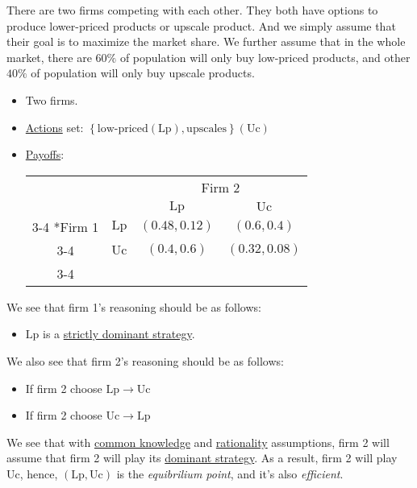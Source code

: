 \begin{eg}\label{eg:two-firms}
	There are two firms competing with each other. They both have options to produce lower-priced products or upscale product. And we simply assume that
	their goal is to maximize the market share. We further assume that in the whole market, there are \(60\%\) of population will only buy low-priced products, and other \(40\%\)
	of population will only buy upscale products.
	\begin{itemize}
		\item Two firms.
		\item \hyperref[def:strategy]{Actions} set: \(\left\{\text{low-priced} (\mathrm{Lp}), \text{upscales}\right\} (\mathrm{Uc} )\)
		\item \hyperref[def:reward]{Payoffs}:
		      \begin{table}[H]
			      \centering
			      \setlength{\extrarowheight}{2pt}
			      \begin{tabular}{cc|c|c|}
				                            & \multicolumn{1}{c}{} & \multicolumn{2}{c}{Firm 2}                                            \\
				                            & \multicolumn{1}{c}{} & \multicolumn{1}{c}{$\mathrm{Lp}$} & \multicolumn{1}{c}{$\mathrm{Uc}$} \\\cline{3-4}
				      \multirow{2}*{Firm 1} & $\mathrm{Lp}$        & $(0.48, 0.12)$                    & $(0.6, 0.4)$                      \\\cline{3-4}
				                            & $\mathrm{Uc}$        & $(0.4, 0.6)$                      & $(0.32, 0.08)$                    \\\cline{3-4}
			      \end{tabular}
		      \end{table}
	\end{itemize}
	We see that firm 1's reasoning should be as follows:
	\begin{itemize}
		\item \(\mathrm{Lp}\) is a \hyperref[def:dominant-strategy]{strictly dominant strategy}.
	\end{itemize}

	We also see that firm 2's reasoning should be as follows:
	\begin{itemize}
		\item If firm 2 choose \(\mathrm{Lp} \to \mathrm{Uc}\)
		\item If firm 2 choose \(\mathrm{Uc} \to \mathrm{Lp}\)
	\end{itemize}

	We see that with \hyperref[common-knowledge]{common knowledge} and \hyperref[rationality]{rationality} assumptions,
	firm 2 will assume that firm 2 will play its \hyperref[def:dominant-strategy]{dominant strategy}.
	As a result, firm 2 will play \(\mathrm{Uc}\), hence, \((\mathrm{Lp}, \mathrm{Uc})\) is the \emph{equibrilium point}, and it's also \emph{efficient}.
\end{eg}

